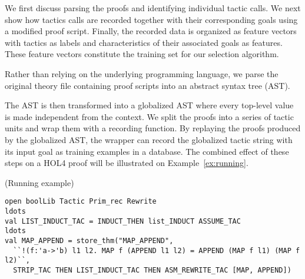 \documentclass[runningheads,a4paper,draft]{svjour3}
\def\holfour{\textsf{HOL4}\xspace}
\begin{document}


We first discuss parsing the proofs and identifying 
individual tactic calls. We next show how tactics calls are recorded together 
with their corresponding goals using a modified proof script.
Finally, the recorded data is organized as feature vectors with tactics as 
labels and characteristics of their associated goals as features. 
These feature vectors constitute the training set for our selection algorithm.

Rather than relying on the underlying programming language, we parse the
original theory file containing proof scripts into an
abstract syntax tree (AST).


 The AST is then transformed into a globalized AST
where every top-level value is made independent from
the context.  We 
split the proofs into a series of tactic units and wrap them 
with a recording function.
By replaying the proofs produced by the globalized AST, the wrapper can
record the globalized tactic string with its input goal as training examples in
a database.
The combined effect of these steps on a \holfour proof will be illustrated on 
Example~\ref{ex:running}.

\begin{example}\label{ex:running}(Running example)
\small
\begin{lstlisting}[language=SMLSmall,frame=tb]
open boolLib Tactic Prim_rec Rewrite
ldots
val LIST_INDUCT_TAC = INDUCT_THEN list_INDUCT ASSUME_TAC
ldots
val MAP_APPEND = store_thm("MAP_APPEND",
  ``!(f:'a->'b) l1 l2. MAP f (APPEND l1 l2) = APPEND (MAP f l1) (MAP f l2)``,
  STRIP_TAC THEN LIST_INDUCT_TAC THEN ASM_REWRITE_TAC [MAP, APPEND])
\end{lstlisting}
\end{example} 
\end{document}
